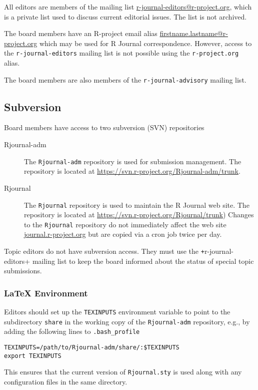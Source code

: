 \documentclass[11pt]{article}
\begin{document}
All editors are members of the mailing list
\url{r-journal-editors@r-project.org}, which is a private list used to
discuss current editorial issues. The list is not archived.
 
The board members have an R-project email alias
\url{firstname.lastname@r-project.org} which may be used for R Journal
correspondence.  However, access to the \verb+r-journal-editors+ mailing list
is not possible using the \verb+r-project.org+ alias.

The board members are also members of the \verb+r-journal-advisory+
mailing list.

\subsection{Subversion}

Board members have access to two subversion (SVN) repositories
\begin{description}
\item[Rjournal-adm] The \texttt{Rjournal-adm} repository is used for
  submission management. The repository is located at
  \url{https://svn.r-project.org/Rjournal-adm/trunk}.
\item[Rjournal] The \texttt{Rjournal} repository is used to maintain
  the R Journal web site. The repository is located at
  \url{https://svn.r-project.org/Rjournal/trunk}) Changes to the
  \texttt{Rjournal} repository do not immediately affect the web site
  \url{journal.r-project.org} but are copied via a cron job twice per
  day.
\end{description}
Topic editors do not have subversion access. They must use the
\texttt+r-journal-editors+ mailing list to keep the board informed
about the status of special topic submissions.

\subsubsection{LaTeX Environment}

Editors should set up the \texttt{TEXINPUTS} environment variable to
point to the subdirectory \texttt{share} in the working copy of the
\texttt{Rjournal-adm} repository, e.g., by adding the following lines to
\verb+.bash_profile+

\begin{verbatim}
TEXINPUTS=/path/to/Rjournal-adm/share/:$TEXINPUTS
export TEXINPUTS
\end{verbatim}

This ensures that the current version of \texttt{Rjournal.sty} is used
along with any configuration files in the same directory.
\end{document}
